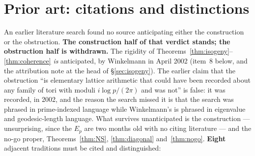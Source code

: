 \documentclass[11pt]{article}
\theoremstyle{definition}
\theoremstyle{remark}
\begin{document}
\section{Prior art: citations and distinctions}
\label{sec:priorart}

An earlier literature search found no source anticipating either the
construction or the obstruction. \textbf{The construction half of that verdict
stands; the obstruction half is withdrawn.} The rigidity of
Theorems~\ref{thm:isogeny}--\ref{thm:coherence} \emph{is} anticipated, by
Winkelmann in April 2002 (item~8 below, and the attribution note at the head of
\S\ref{sec:isogeny}). The earlier claim that the obstruction ``is elementary
lattice arithmetic that could have been recorded about any family of tori with
moduli $i \log p/(2\pi)$ and was not'' is false: it was recorded, in 2002, and
the reason the search missed it is that the search was phrased in prime-indexed
language while Winkelmann's is phrased in eigenvalue and geodesic-length
language. What survives unanticipated is the construction --- unsurprising, since
the $E_p$ are two months old with no citing literature --- and the no-go proper,
Theorems~\ref{thm:NS}, \ref{thm:diagonal} and~\ref{thm:nogo}. \textbf{Eight}
adjacent traditions must be cited and distinguished:
\end{document}
